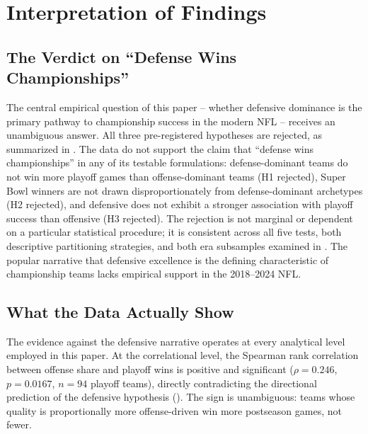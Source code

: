 \section{Interpretation of Findings}
\label{sec:interpretation}

\subsection{The Verdict on ``Defense Wins Championships''}
\label{sec:verdict}

The central empirical question of this paper -- whether defensive dominance is
the primary pathway to championship success in the modern NFL -- receives an
unambiguous answer. All three pre-registered hypotheses are rejected, as
summarized in . The data do not support the claim
that ``defense wins championships'' in any of its testable formulations: defense-dominant
teams do not win more playoff games than offense-dominant teams (H1 rejected),
Super Bowl winners are not drawn disproportionately from defense-dominant
archetypes (H2 rejected), and defensive \xvoa{} does not exhibit a stronger
association with playoff success than offensive \xvoa{} (H3 rejected). The
rejection is not marginal or dependent on a particular statistical procedure; it
is consistent across all five tests, both descriptive partitioning strategies,
and both era subsamples examined in . The popular narrative
that defensive excellence is the defining characteristic of championship teams
lacks empirical support in the 2018--2024 NFL.

\subsection{What the Data Actually Show}
\label{sec:what-data-show}

The evidence against the defensive narrative operates at every analytical level
employed in this paper. At the correlational level, the Spearman rank
correlation between offense share and playoff wins is positive and significant
($\rho = 0.246$, $p = 0.0167$, $n = 94$ playoff teams), directly contradicting
the directional prediction of the defensive hypothesis ().
The sign is unambiguous: teams whose quality is proportionally more
offense-driven win more postseason games, not fewer.

